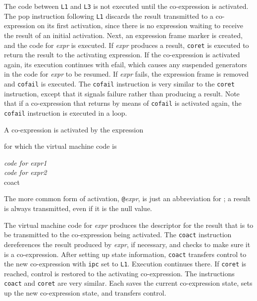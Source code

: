 The code between \texttt{L1} and \texttt{L3} is not executed until the
co-expression is activated. The pop instruction following \texttt{L1}
discards the result transmitted to a co-expression on its first
activation, since there is no expression waiting to receive the result
of an initial activation. Next, an expression frame marker is created,
and the code for \textit{expr} is executed. If
\textit{expr} produces a result, \texttt{coret} is
executed to return the result to the activating expression. If the
co-expression is activated again, its execution continues with efail,
which causes any suspended generators in the code for
\textit{expr} to be resumed. If
\textit{expr} fails, the expression frame is removed
and \texttt{cofail} is executed. The \texttt{cofail} instruction is
very similar to the \texttt{coret} instruction, except that it signals
failure rather than producing a result. Note that if a co-expression
that returns by means of \texttt{cofail} is activated again, the
\texttt{cofail} instruction is executed in a loop.

A co-expression is activated by the expression


\noindent for which the virtual machine code is

\begin{iconcode}
\>\textit{code for expr1}\\
\>\textit{code for expr2}\\
\>coact\\
\end{iconcode}

The more common form of activation,
\texttt{@}\textit{expr}, is just an abbreviation for
; a result is always
transmitted, even if it is the null value.

The virtual machine code for \textit{expr} produces
the descriptor for the result that is to be transmitted to the
co-expression being activated. The \texttt{coact} instruction
dereferences the result produced by \textit{expr}, if
necessary, and checks to make sure it is a co-expression. After
setting up state information, \texttt{coact} transfers control to the
new co-expression with \texttt{ipc} set to \texttt{L1}. Execution
continues there. If \texttt{coret} is reached, control is restored to
the activating co-expression. The instructions \texttt{coact} and
\texttt{coret} are very similar. Each saves the current co-expression
state, sets up the new co-expression state, and transfers control.

